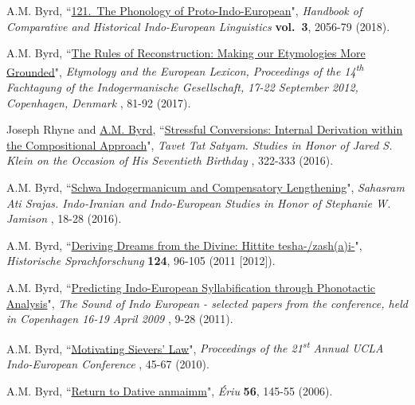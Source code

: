 \documentclass[paper=letter,fontsize=11pt]{scrartcl}
\newcommand{\PaperEntry}[7]{
		\noindent #1, ``\href{#7}{#2}", \textit{#3} \textbf{#4}, #5 (#6).}
\begin{document}
\begin{etaremune}
\item \PaperEntry{A.M. Byrd}{121.~The Phonology of Proto-Indo-European}{Handbook of Comparative and Historical Indo-European Linguistics}{vol.~3}{2056-79}{2018}{https://www.degruyter.com/view/product/487972} 

\item \PaperEntry{A.M. Byrd}{The Rules of Reconstruction: Making our Etymologies More Grounded}{Etymology and the European Lexicon, Proceedings of the 14\textsuperscript{th} Fachtagung of the Indogermanische Gesellschaft, 17-22 September 2012, Copenhagen, Denmark}{\hspace{-.35em}}{81-92}{2017}{https://reichert-verlag.de/buchreihen/sprachwissenschaft_reihen/sprachwissenschaft_akten_der_fachtagung_der_indogermanischen_gesellschaft/9783954902026_etymology_and_the_european_lexicon-detail} 

\item \PaperEntry{Joseph Rhyne and \underline{A.M. Byrd}}{Stressful Conversions: Internal Derivation within the Compositional Approach}{Tavet Tat Satyam. Studies in Honor of Jared S. Klein on the Occasion of His Seventieth Birthday}{\hspace{-.35em}}{322-333}{2016}{http://www.beechstave.com/tavet.htm}

\item \PaperEntry{A.M. Byrd}{Schwa Indogermanicum and Compensatory Lengthening}{Sahasram Ati Srajas. Indo-Iranian and Indo-European Studies in Honor of Stephanie W. Jamison}{\hspace{-.35em}}{18-28}{2016}{http://www.beechstave.com/sahas.htm}

\item \PaperEntry{A.M. Byrd}{Deriving Dreams from the Divine: Hittite tesha-/zash(a)i-}{Historische Sprachforschung}{124}{96-105}{2011 [2012]}{http://rootsofeurope.ku.dk/english/activities/sound_of_indo-european/}

\item \PaperEntry{A.M. Byrd}{Predicting Indo-European Syllabification through Phonotactic Analysis}{The Sound of Indo European - selected papers from the conference, held in Copenhagen 16-19 April 2009}{\hspace{-.35em}}{9-28}{2011}{http://rootsofeurope.ku.dk/english/activities/sound_of_indo-european/}

\item \PaperEntry{A.M. Byrd}{Motivating Sievers’ Law}{Proceedings of the 21\textsuperscript{st} Annual UCLA Indo-European Conference}{\hspace{-.35em}}{45-67}{2010}{https://www.academia.edu/1166462/Motivating_Sievers_Law} 

\item \PaperEntry{A.M. Byrd}{Return to Dative anmaimm}{Ériu}{56}{145-55}{2006}{https://bill.celt.dias.ie/vol4/displayObject.php?TreeID=3182} 

\end{etaremune}
\end{document}
